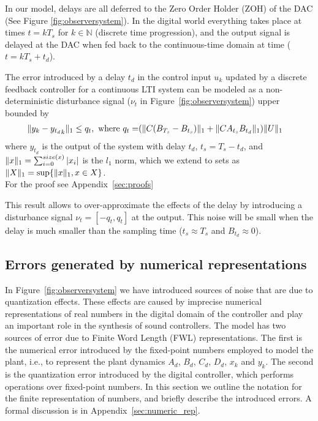 \documentclass[a4paper,UKenglish]{lipics-v2018}
\DeclarePairedDelimiter\norm{\lVert}{\rVert}
\newcommand{\mat}[1]{{#1}}
\renewcommand{\vec}[1]{{#1}}
\begin{document}
In our model, delays are all deferred to the Zero Order Holder (ZOH) of the
DAC (See Figure \ref{fig:observersystem}).  In the digital world everything
takes place at times $t=kT_s$ for $k \in \mathbb{N}$ (discrete time
progression), and the output signal is delayed at the DAC when fed back to
the continuous-time domain at time ($t=kT_s+t_d$).

\begin{theorem}
%
The error introduced by a delay $t_d$ in the control input $\vec{u}_k$ updated
by a discrete feedback controller for a continuous LTI system can be modeled as
a non-deterministic disturbance signal ($\nu_t$ in
Figure~\ref{fig:observersystem}) upper bounded by
%
\begin{align}
\norm{\vec{y}_{k}-{\vec{y}_{t_d}}_{k}}_1 \leq q_t, \text{ where } q_t=&(\norm{\mat{C}(\mat{B}_{T_s}-\mat{B}_{t_s})}_1+\norm{\mat{C}\mat{A}_{t_s}\mat{B}_{t_d}}_1)\norm{U}_1
\end{align}
where $\vec{y}_{t_d}$ is the output of the system with delay $t_d$, $t_s=T_s-t_d$,
and $\norm{\vec{x}}_1=\sum_{i=0}^{size(\vec{x})} |\vec{x}_i|$ is the $l_1$ norm, 
which we extend to sets as $\norm{X}_1 = \sup \{\norm{\vec{x}}_1, \vec{x} \in X\}$.\\ 
For the proof see Appendix~\ref{sec:proofs}
\end{theorem}
%
This result allows to over-approximate the effects of the delay by introducing a disturbance signal $\nu_t=[-q_t, q_t]$ at the output.
 This noise will be small when the delay is much smaller than the sampling time ($t_s\approx T_s$ and $\mat{B}_{t_d} \approx 0$).

\subsection{Errors generated by numerical representations} 
\label{sec:numeric_rep2}

In Figure~\ref{fig:observersystem} we have introduced sources of noise that
are due to quantization effects.  These effects are caused by imprecise
numerical representations of real numbers in the digital domain of the
controller and play an important role in the synthesis of sound controllers. 
The model has two sources of error due to Finite Word Length (FWL)
representations.  The first is the numerical error introduced by the
fixed-point numbers employed to model the plant, i.e., to represent the
plant dynamics $A_d$, $B_d$, $C_d$, $D_d$, $x_k$ and $y_k$.  The second is
the quantization error introduced by the digital controller, which performs
operations over fixed-point numbers.  In this section we outline the
notation for the finite representation of numbers, and briefly describe the
introduced errors.  A formal discussion is in
Appendix~\ref{sec:numeric_rep}.
\end{document}
